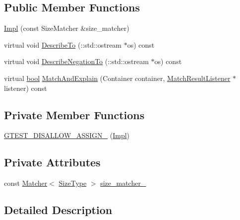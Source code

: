 \subsection*{Public Member Functions}
\begin{DoxyCompactItemize}
\item 
\hyperlink{classtesting_1_1internal_1_1SizeIsMatcher_1_1Impl_aa5279c8598ec8982546350fb442223f3}{Impl} (const Size\+Matcher \&size\+\_\+matcher)
\item 
virtual void \hyperlink{classtesting_1_1internal_1_1SizeIsMatcher_1_1Impl_a6b2524886e5fa751e96495a74d75b7cd}{Describe\+To} (\+::std\+::ostream $\ast$os) const
\item 
virtual void \hyperlink{classtesting_1_1internal_1_1SizeIsMatcher_1_1Impl_a24b76fc2ac7b8d58cb5c7a3c5d5d35ab}{Describe\+Negation\+To} (\+::std\+::ostream $\ast$os) const
\item 
virtual \hyperlink{classbool}{bool} \hyperlink{classtesting_1_1internal_1_1SizeIsMatcher_1_1Impl_a5180472f5a18b8c0314ed835c52e09d4}{Match\+And\+Explain} (Container container, \hyperlink{classtesting_1_1MatchResultListener}{Match\+Result\+Listener} $\ast$listener) const
\end{DoxyCompactItemize}
\subsection*{Private Member Functions}
\begin{DoxyCompactItemize}
\item 
\hyperlink{classtesting_1_1internal_1_1SizeIsMatcher_1_1Impl_a28ece612a673383855250514da1330bb}{G\+T\+E\+S\+T\+\_\+\+D\+I\+S\+A\+L\+L\+O\+W\+\_\+\+A\+S\+S\+I\+G\+N\+\_\+} (\hyperlink{classtesting_1_1internal_1_1SizeIsMatcher_1_1Impl}{Impl})
\end{DoxyCompactItemize}
\subsection*{Private Attributes}
\begin{DoxyCompactItemize}
\item 
const \hyperlink{classtesting_1_1Matcher}{Matcher}$<$ \hyperlink{classtesting_1_1internal_1_1SizeIsMatcher_1_1Impl_a5548da0c4c2245ca2fb520f44f0a687a}{Size\+Type} $>$ \hyperlink{classtesting_1_1internal_1_1SizeIsMatcher_1_1Impl_a47227c64c6261eb2bc5a69e2ed9ac921}{size\+\_\+matcher\+\_\+}
\end{DoxyCompactItemize}


\subsection{Detailed Description}
